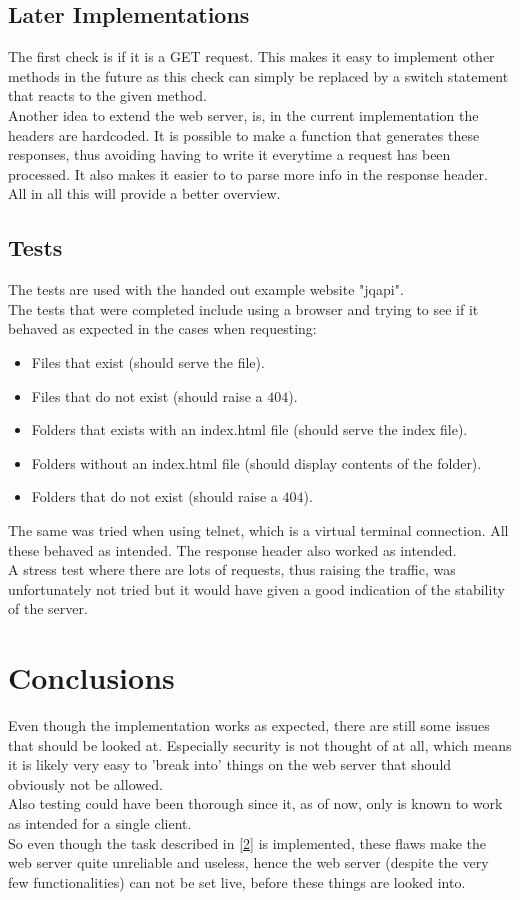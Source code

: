 \documentclass{acm_proc_article-sp}
\begin{document}
\subsection{Later Implementations}
The first check is if it is a GET request. This makes it easy to implement other methods in the future as this check can simply be replaced by a switch statement that reacts to the given method.\\
Another idea to extend the web server, is, in the current implementation the headers are hardcoded. It is possible to make a function that generates these responses, thus avoiding having to write it everytime a request has been processed. It also makes it easier to to parse more info in the response header. \\
All in all this will provide a better overview.

\subsection{Tests}
The tests are used with the handed out example website "jqapi".\\
The tests that were completed include using a browser and trying to see if it behaved as expected in the cases when requesting:
\begin{itemize}
\item Files that exist (should serve the file).
\item Files that do not exist (should raise a $404$).
\item Folders that exists with an index.html file (should serve the index file).
\item Folders without an index.html file (should display contents of the folder).
\item Folders that do not exist (should raise a $404$).
\end{itemize}
The same was tried when using telnet, which is a virtual terminal connection. All these behaved as intended. The response header also worked as intended.\\
A stress test where there are lots of requests, thus raising the traffic, was unfortunately not tried but it would have given a good indication of the stability of the server.

\section{Conclusions}
Even though the implementation works as expected, there are still some issues that should be looked at. Especially security is not thought of at all, which means it is likely very easy to 'break into' things on the web server that should obviously not be allowed.\\
Also testing could have been thorough since it, as of now, only is known to work as intended for a single client.\\
So even though the task described in \ref{2} is implemented, these flaws make the web server quite unreliable and useless, hence the web server (despite the very few functionalities) can not be set live, before these things are looked into.
\end{document}
